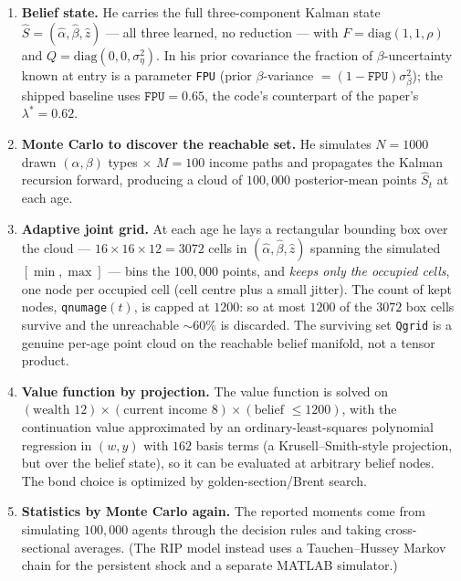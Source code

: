 \documentclass[11pt,fleqn]{article}
\begin{document}
\begin{enumerate}
\item \textbf{Belief state.} He carries the full three-component Kalman state
$\hat{S}=(\hat\alpha,\hat\beta,\hat z)$ --- all three learned, no reduction --- with
$F=\mathrm{diag}(1,1,\rho)$ and $Q=\mathrm{diag}(0,0,\sigma^2_\eta)$. In his prior
covariance the fraction of $\beta$-uncertainty known at entry is a parameter
\texttt{FPU} (prior $\beta$-variance $=(1-\texttt{FPU})\sigma^2_\beta$); the shipped
baseline uses $\texttt{FPU}=0.65$, the code's counterpart of the paper's
$\lambda^*=0.62$.

\item \textbf{Monte Carlo to discover the reachable set.} He simulates
$N=1000$ drawn $(\alpha,\beta)$ types $\times$ $M=100$ income paths and propagates
the Kalman recursion forward, producing a cloud of $100{,}000$ posterior-mean points
$\hat{S}_t$ at each age.

\item \textbf{Adaptive joint grid.} At each age he lays a rectangular bounding box
over the cloud --- $16\times16\times12=3072$ cells in $(\hat\alpha,\hat\beta,\hat z)$
spanning the simulated $[\min,\max]$ --- bins the $100{,}000$ points, and
\emph{keeps only the occupied cells}, one node per occupied cell (cell centre plus a
small jitter). The count of kept nodes, \texttt{qnumage}$(t)$, is capped at $1200$:
so at most $1200$ of the $3072$ box cells survive and the unreachable $\sim$60\% is
discarded. The surviving set \texttt{Qgrid} is a genuine per-age point cloud on the
reachable belief manifold, not a tensor product.

\item \textbf{Value function by projection.} The value function is solved on
$(\text{wealth }12)\times(\text{current income }8)\times(\text{belief }\le1200)$, with
the continuation value approximated by an ordinary-least-squares polynomial regression
in $(w,y)$ with $162$ basis terms (a Krusell--Smith-style projection, but over the
belief state), so it can be evaluated at arbitrary belief nodes. The bond choice is
optimized by golden-section/Brent search.

\item \textbf{Statistics by Monte Carlo again.} The reported moments come from
simulating $100{,}000$ agents through the decision rules and taking cross-sectional
averages. (The RIP model instead uses a Tauchen--Hussey Markov chain for the
persistent shock and a separate MATLAB simulator.)
\end{enumerate}
\end{document}
